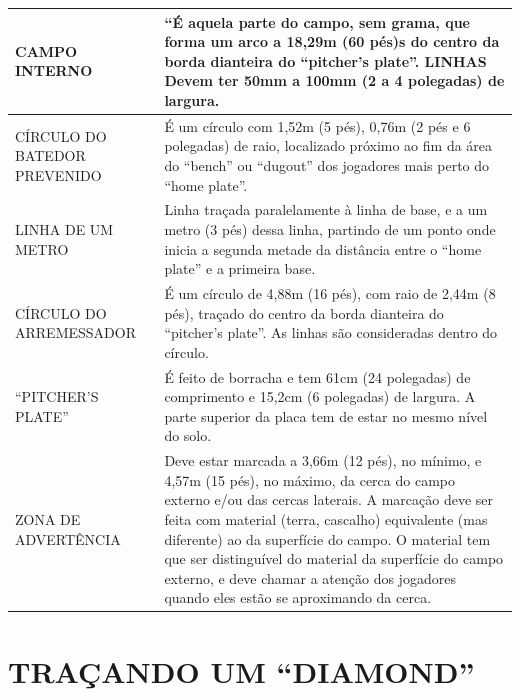 {\begin{tabular}{p{40mm}p{160mm}}
		CAMPO INTERNO &
		“É aquela parte do campo, sem grama, que forma um arco a 18,29m (60 pés)s do 
		centro da borda dianteira do “pitcher’s plate”. LINHAS 
		Devem ter 50mm a 100mm (2 a 4 polegadas) de largura. \\\hline
		CÍRCULO DO BATEDOR PREVENIDO &
		É um círculo com 1,52m (5 pés), 0,76m (2 pés e 6 polegadas) de raio, localizado 
		próximo ao fim da área do “bench” ou “dugout” dos jogadores mais perto do “home 
		plate”. \\\hline
		LINHA DE UM METRO &
		Linha traçada paralelamente à linha de base, e a um metro (3 pés) dessa linha, 
		partindo de um ponto onde inicia a segunda metade da distância entre o “home plate” 
		e a primeira base. \\\hline
		CÍRCULO DO ARREMESSADOR &
		É um círculo de 4,88m (16 pés), com raio de 2,44m (8 pés), traçado do centro da borda 
		dianteira do “pitcher’s plate”. As linhas são consideradas dentro do círculo. \\\hline
		“PITCHER’S PLATE” &
		É feito de borracha e tem 61cm (24 polegadas) de comprimento e 15,2cm (6 
		polegadas) de largura. A parte superior da placa tem de estar no mesmo nível do solo. \\\hline
		ZONA DE ADVERTÊNCIA &
		Deve estar marcada a 3,66m (12 pés), no mínimo, e 4,57m (15 pés), no máximo, da 
		cerca do campo externo e/ou das cercas laterais. A marcação deve ser feita com 
		material (terra, cascalho) equivalente (mas diferente) ao da superfície do campo. O 
		material tem que ser distinguível do material da superfície do campo externo, e deve 
		chamar a atenção dos jogadores quando eles estão se aproximando da cerca. \\\hline
		
	\end{tabular}
}
\section{TRAÇANDO UM “DIAMOND” }

